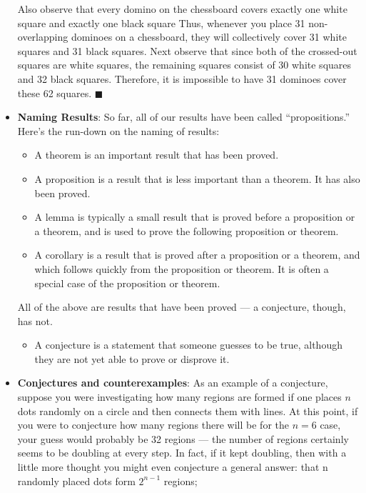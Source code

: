 \documentclass{report}
\begin{document}
\begin{itemize}
            \bigbreak \noindent 
            Also observe that every domino on the chessboard covers exactly one white square and exactly one black square
            \bigbreak \noindent 
            Thus, whenever you place 31 non-overlapping dominoes on a chessboard, they will collectively cover 31 white squares and 31 black squares.
            \bigbreak \noindent 
            Next observe that since both of the crossed-out squares are white squares, the remaining squares consist of 30 white squares and 32 black squares. Therefore, it is impossible to have 31 dominoes cover these 62 squares. $\blacksquare$
        \item \textbf{Naming Results}: So far, all of our results have been called “propositions.” Here’s the run-down on the naming of results:
            \begin{itemize}
                \item A theorem is an important result that has been proved.
                \item A proposition is a result that is less important than a theorem. It has also been proved.
                \item A lemma is typically a small result that is proved before a proposition or a theorem, and is used to prove the following proposition or theorem.
                \item A corollary is a result that is proved after a proposition or a theorem, and which follows quickly from the proposition or theorem. It is often a special case of the proposition or theorem.
            \end{itemize}
            All of the above are results that have been proved — a conjecture, though, has not.
            \begin{itemize}
                \item A conjecture is a statement that someone guesses to be true, although they are not yet able to prove or disprove it.
            \end{itemize}
        \item \textbf{Conjectures and counterexamples}: As an example of a conjecture, suppose you were investigating how many regions are formed if one places $n$ dots randomly on a circle and then connects them with lines.
            \bigbreak \noindent 
            \bigbreak \noindent 
            At this point, if you were to conjecture how many regions there will be for the $n = 6$ case, your guess would probably be 32 regions — the number of regions certainly seems to be doubling at every step. In fact, if it kept doubling, then with a little more thought you might even conjecture a general answer: that n randomly placed dots form $2^{n-1}$ regions;

\end{itemize}
\end{document}
